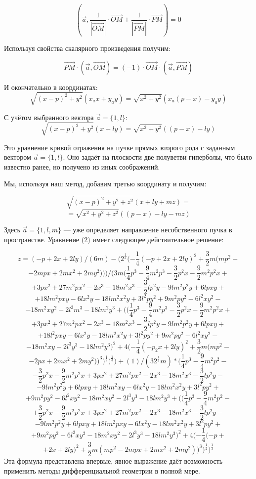 $$\left(\vec a,\frac{1}{|\overrightarrow{OM}|}\cdot\overrightarrow{OM}+\frac{1}{|\overrightarrow{PM}|}\cdot\overrightarrow{PM}\right) =0$$



Используя свойства скалярного произведения получим:

$$\overrightarrow{PM}\cdot(\vec a ,\overrightarrow{OM})=(-1)\cdot\overrightarrow{OM}\cdot(\vec a,\overrightarrow{PM})$$

И  окончательно в координатах:
\[
\sqrt{(x-p)^2+y^2}
\left(x_a x +y_a y\right)
=
\sqrt{x^2+y^2}
\left( x_a (p-x)-y_ay \right)
\]

С учётом выбранного вектора $\vec a = \{ 1,l \}$:
\[
\sqrt{(x-p)^2+y^2}
\left(x+l y\right)
=
\sqrt{x^2+y^2}
\left( (p-x)-l y \right)
\]

Это уравнение кривой отражения на пучке прямых второго рода с заданным вектором $\vec a = \{ 1,l \}$. Оно задаёт на плоскости две полуветви гиперболы, что было известно ранее, но получено из иных соображений.

Мы, используя наш метод, добавим третью координату и получим:

\[
\sqrt{(x-p)^2+y^2+z^2}
\left(x+l y+m z\right)
= \]
\[=
\sqrt{x^2+y^2+z^2}
\left( (p-x)-l y-m z \right)
\]


Здесь $\vec a = \{ 1,l,m\}$ --- уже определяет направление несобственного пучка в пространстве.
Уравнение (2) имеет следующее действительное решение:

$$z=(-p+2x+2ly)/(6m)-(2^\frac{1}{3}(-\frac{1}{4}(-p+2x+2ly)^2 +\frac{3}{2} m(mp^2-$$
$$-2mpx+2mx^2+2my^2)))/(3m(\frac{1}{4}p^3-\frac{9}{4}m^2p^3-\frac{3}{2}p^2x-\frac{9}{2}m^2p^2x+$$
$$+3px^2+27m^2px^2-2x^3-18m^2x^3-\frac{3}{2}lp^2y-9lm^2p^2y+6lpxy+$$
$$+18lm^2pxy-6lx^2y-18lm^2x^2y+3l^2py^2+9m^2py^2-6l^2xy^2-$$
$$-18m^2xy^2-2l^3m^3-18lm^2y^3+((\frac{1}{4}p^3-\frac{9}{4}m^2p^3-\frac{3}{2}p^2x-\frac{9}{2}m^2p^2x+$$
$$+3px^2+27m^2px^2-2x^3-18m^2x^3-\frac{3}{2}lp^2y-9lm^2p^2y+6lpxy+$$
$$+18l^2pxy-6lx^2y-18lm^2x^2y+3l^2py^2+9m^2py^2-6l^2xy^2-$$
$$-18m^2xy-2l^3y^3-18lm^2y^3)^2+4(-\frac{1}{4}(-p_2x+2ly)^2+\frac{3}{2}m(mp^2-$$
$$-2px+2mx^2+2my^2))^3)^\frac{1}{2})^\frac{1}{3}) +
(1)/(32^\frac{1}{3}m) *
(\frac{1}{4}p^3-\frac{9}{4}m^2p^2-$$
$$-\frac{3}{2}p^2x-\frac{9}{2}m^2p^2x+3px^2+27m^2px^2-2x^3-18m^2x^3-\frac{3}{2}lp^2y-$$
$$-9lm^2p^2y+6lpxy+18lm^2xy-6lx^2y-18lm^2x^2y+3l^2py^2+$$
$$+9m^2py^2-6l^2xy^2-18m^2xy^2-2l^3y^3-18lm^2y^3+((\frac{1}{4}p^3-\frac{9}{4}m^2p^2-$$
$$+\frac{3}{2}p^2x-\frac{9}{2}m^2p^2x+3px^2+27m^2px^2-2x^3-18m^2x^3-\frac{3}{2}lp^2y-$$
$$-9lm^2p^2y+6lpxy+18lm^2pxy-6lx^2y-18lm^2x^2y+3l^2py^2+$$
$$+9m^2py^2-6l^2xy^2-18m^2xy^2-2l^3y^3-18lm^2y^3)^2+4(-\frac{1}{4}(-p+$$
$$+2x+2ly)^2+\frac{3}{2}m(mp^2-2mpx+2mx^2+2my^2))^3)^\frac{1}{2})^\frac{1}{3}$$
Эта формула представлена впервые, явное выражение даёт возможность применить методы дифференциальной геометрии в полной мере.

